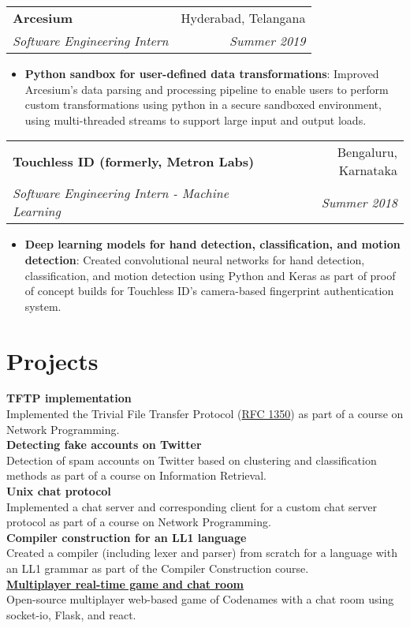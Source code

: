 \documentclass[letterpaper,11pt]{article}
\makeatletter
\newcommand{\resumeItem}[2]{
  \item\small{
    \textbf{#1}{: #2 \vspace{-1pt}}
  }
}
\newcommand{\resumeSubheading}[4]{
  \vspace{10pt}
    \begin{tabular*}{0.97\textwidth}{l@{\extracolsep{\fill}}r}
      \textbf{#1} & #2 \\
      \textit{\small#3} & \textit{\small #4} \\
    \end{tabular*}\vspace{-1pt}
}
\newcommand{\resumeItemListStart}{\begin{itemize}}
\newcommand{\resumeItemListEnd}{\end{itemize}\vspace{-2pt}}
\makeatother
\begin{document}
\resumeSubheading
{Arcesium}{Hyderabad, Telangana}
{Software Engineering Intern}{Summer 2019}
\resumeItemListStart
\resumeItem{Python sandbox for user-defined data transformations}
{Improved Arcesium's data parsing and processing pipeline to enable users to perform custom transformations using python in a secure sandboxed environment, using multi-threaded streams to support large input and output loads.}
\resumeItemListEnd

\resumeSubheading
{Touchless ID (formerly, Metron Labs)}{Bengaluru, Karnataka}
{Software Engineering Intern - Machine Learning}{Summer 2018}
\resumeItemListStart
\resumeItem{Deep learning models for hand detection, classification, and motion detection}
{Created convolutional neural networks for hand detection, classification, and motion detection using Python and Keras as part of proof of concept builds for Touchless ID's camera-based fingerprint authentication system.}
\resumeItemListEnd


\section{Projects}
\textbf{TFTP implementation} \\
Implemented the Trivial File Transfer Protocol (\href{https://datatracker.ietf.org/doc/html/rfc1350}{RFC 1350}) as part of a course on Network Programming.
\vspace{3mm} \\
\textbf{Detecting fake accounts on Twitter} \\
Detection of spam accounts on Twitter based on clustering and classification methods as part of a course on Information Retrieval.
\vspace{3mm} \\
\textbf{Unix chat protocol} \\
Implemented a chat server and corresponding client for a custom chat server protocol as part of a course on Network Programming.
\vspace{3mm} \\
\textbf{Compiler construction for an LL1 language} \\
Created a compiler (including lexer and parser) from scratch for a language with an LL1 grammar as part of the Compiler Construction course.
\vspace{3mm} \\
\textbf{\href{https://github.com/naveen-u/lets-play}{Multiplayer real-time game and chat room}} \\
Open-source multiplayer web-based game of Codenames with a chat room using socket-io, Flask, and react.
\end{document}
